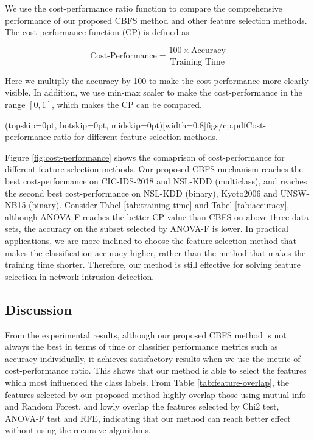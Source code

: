 \documentclass{ieeeaccess}
\theoremstyle{definition}
\begin{document}
We use the cost-performance ratio function to compare the comprehensive performance of our proposed CBFS method and other feature selection methods. The cost performance function (CP) is defined as

\begin{equation}
    \text{Cost-Performance} = \frac{100 \times \text{Accuracy}}{\text{Training Time}}
\end{equation}

Here we multiply the accuracy by 100 to make the cost-performance more clearly visible. In addition, we use min-max scaler to make the cost-performance in the range $[0, 1]$, which makes the CP can be compared.

\Figure[!htpb](topskip=0pt, botskip=0pt, midskip=0pt)[width=0.8\textwidth]{figs/cp.pdf}{Cost-performance ratio for different feature selection methods. \label{fig:cost-performance}}

Figure \ref{fig:cost-performance} shows the comaprison of cost-performance for different feature selection methods. Our proposed CBFS mechanism reaches the best cost-performance on CIC-IDS-2018 and NSL-KDD (multiclass), and reaches the second best cost-performance on NSL-KDD (binary), Kyoto2006 and UNSW-NB15 (binary). Consider Tabel \ref{tab:training-time} and Tabel \ref{tab:accuracy}, although ANOVA-F reaches the better CP value than CBFS on above three data sets, the accuracy on the subset selected by ANOVA-F is lower. In practical applications, we are more inclined to choose the feature selection method that makes the classification accuracy higher, rather than the method that makes the training time shorter. Therefore, our method is still effective for solving feature selection in network intrusion detection.

\subsection{Discussion}

From the experimental results, although our proposed CBFS method is not always the best in terms of time or classifier performance metrics such as accuracy individually, it achieves satisfactory results when we use the metric of cost-performance ratio. This shows that our method is able to select the features which most influenced the class labels. From Table \ref{tab:feature-overlap}, the features selected by our proposed method highly overlap those using mutual info and Random Forest, and lowly overlap the features selected by Chi2 test, ANOVA-F test and RFE, indicating that our method can reach better effect without using the recursive algorithms.
\end{document}
